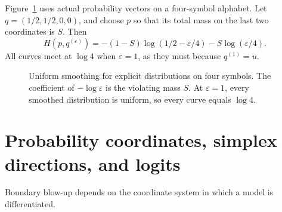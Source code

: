 \documentclass[11pt,a4paper]{article}
\theoremstyle{definition}
\theoremstyle{remark}
\begin{document}
Figure~\ref{fig:uniform-smoothing} uses actual probability vectors on a four-symbol alphabet.
Let $q=(1/2,1/2,0,0)$, and choose $p$ so that its total mass on the last two coordinates is $S$.
Then
\[
  H(p,q^{(\varepsilon)})
  = -(1-S)\log(1/2-\varepsilon/4)-S\log(\varepsilon/4).
\]
All curves meet at $\log4$ when $\varepsilon=1$, as they must because $q^{(1)}=u$.

\begin{figure}[ht]
\centering
{}
\caption{Uniform smoothing for explicit distributions on four symbols.
The coefficient of $-\log\varepsilon$ is the violating mass $S$.
At $\varepsilon=1$, every smoothed distribution is uniform, so every curve equals $\log4$.}
\label{fig:uniform-smoothing}
\end{figure}

\section{Probability coordinates, simplex directions, and logits}
\label{sec:gradients}

Boundary blow-up depends on the coordinate system in which a model is differentiated.
\end{document}
